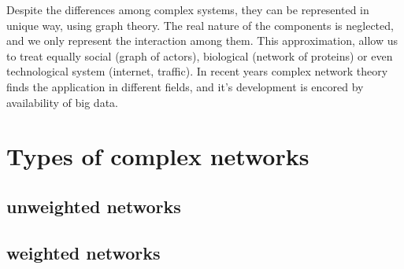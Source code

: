 Despite the differences among complex systems, they can be represented in unique way, using graph theory. The real nature of the components is neglected, and we only represent the interaction among them. This approximation, allow us to treat equally social (graph of actors), biological (network of proteins) or even technological system (internet, traffic). In recent years complex network theory finds the application in different fields, and it's development is encored by availability of big data.





\section{Types of complex networks}

\subsection{unweighted networks}

\subsection{weighted networks}


